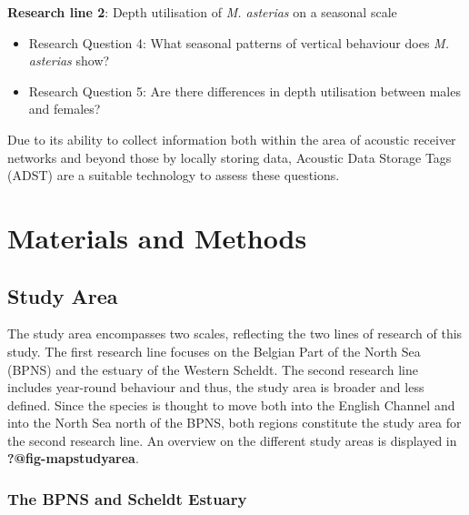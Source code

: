 \documentclass[
  authoryear,
  review,
  3p]{elsarticle}
\providecommand{\tightlist}{%
  \setlength{\itemsep}{0pt}\setlength{\parskip}{0pt}}\usepackage{longtable,booktabs,array}
\begin{document}
\textbf{Research line 2}: Depth utilisation of \emph{M. asterias} on a
seasonal scale

\begin{itemize}
\tightlist
\item
  Research Question 4: What seasonal patterns of vertical behaviour does
  \emph{M. asterias} show?
\item
  Research Question 5: Are there differences in depth utilisation
  between males and females?
\end{itemize}

Due to its ability to collect information both within the area of
acoustic receiver networks and beyond those by locally storing data,
Acoustic Data Storage Tags (ADST) are a suitable technology to assess
these questions.

\hypertarget{sec-mm}{%
\section{Materials and Methods}\label{sec-mm}}

\hypertarget{sec-mm_studyarea}{%
\subsection{Study Area}\label{sec-mm_studyarea}}

The study area encompasses two scales, reflecting the two lines of
research of this study. The first research line focuses on the Belgian
Part of the North Sea (BPNS) and the estuary of the Western Scheldt. The
second research line includes year-round behaviour and thus, the study
area is broader and less defined. Since the species is thought to move
both into the English Channel and into the North Sea north of the BPNS,
both regions constitute the study area for the second research line. An
overview on the different study areas is displayed in
\textbf{?@fig-mapstudyarea}.

\hypertarget{sec-mmscheldtBPNS}{%
\subsubsection{The BPNS and Scheldt Estuary}\label{sec-mmscheldtBPNS}}
\end{document}
